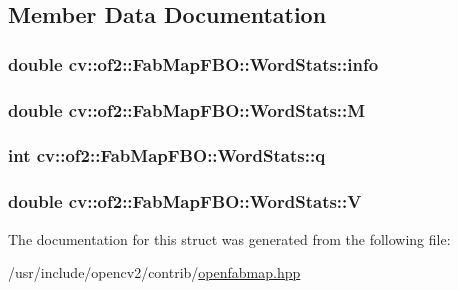 \subsection{Member Data Documentation}
\hypertarget{structcv_1_1of2_1_1FabMapFBO_1_1WordStats_a90a54a427a7da6ae088ea995b69149da}{
\subsubsection[{info}]{\setlength{\rightskip}{0pt plus 5cm}double cv\-::of2\-::\-Fab\-Map\-F\-B\-O\-::\-Word\-Stats\-::info}}\label{structcv_1_1of2_1_1FabMapFBO_1_1WordStats_a90a54a427a7da6ae088ea995b69149da}
\hypertarget{structcv_1_1of2_1_1FabMapFBO_1_1WordStats_aae5faa264a3be1185fd1dd964ed23c66}{
\subsubsection[{M}]{\setlength{\rightskip}{0pt plus 5cm}double cv\-::of2\-::\-Fab\-Map\-F\-B\-O\-::\-Word\-Stats\-::\-M\hspace{0.3cm}{\ttfamily [mutable]}}}\label{structcv_1_1of2_1_1FabMapFBO_1_1WordStats_aae5faa264a3be1185fd1dd964ed23c66}
\hypertarget{structcv_1_1of2_1_1FabMapFBO_1_1WordStats_aa30b1af6bd5a967a5ff6140c0edf0ce2}{
\subsubsection[{q}]{\setlength{\rightskip}{0pt plus 5cm}int cv\-::of2\-::\-Fab\-Map\-F\-B\-O\-::\-Word\-Stats\-::q}}\label{structcv_1_1of2_1_1FabMapFBO_1_1WordStats_aa30b1af6bd5a967a5ff6140c0edf0ce2}
\hypertarget{structcv_1_1of2_1_1FabMapFBO_1_1WordStats_ad10ad107d7bbe868ff8f5a1b9691b994}{
\subsubsection[{V}]{\setlength{\rightskip}{0pt plus 5cm}double cv\-::of2\-::\-Fab\-Map\-F\-B\-O\-::\-Word\-Stats\-::\-V\hspace{0.3cm}{\ttfamily [mutable]}}}\label{structcv_1_1of2_1_1FabMapFBO_1_1WordStats_ad10ad107d7bbe868ff8f5a1b9691b994}


The documentation for this struct was generated from the following file\-:\begin{DoxyCompactItemize}
\item 
/usr/include/opencv2/contrib/\hyperlink{openfabmap_8hpp}{openfabmap.\-hpp}\end{DoxyCompactItemize}
